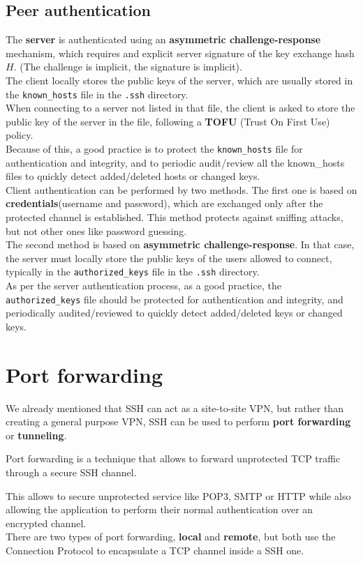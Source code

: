 \subsection{Peer authentication}
The \textbf{server} is authenticated using an \textbf{asymmetric
challenge-response} mechanism, which requires and explicit server
signature of the key exchange hash $H$. (The challenge is implicit,
the signature is implicit).\\
The client locally stores the public keys of the server, which are
usually stored in the \texttt{known\_hosts} file in the \texttt{.ssh}
directory.\\
When connecting to a server not listed in that file, the client is
asked to store the public key of the server in the file, following a 
\textbf{TOFU} (Trust On First Use) policy.\\
Because of this, a good practice is to protect the
\texttt{known\_hosts} file for authentication and integrity, and to
periodic audit/review all the known\_hosts files to quickly detect
added/deleted hosts or changed keys.\\
Client authentication can be performed by two methods. The first one
is based on \textbf{credentials}(username and password), which are
exchanged only after the protected channel is established. This method
protects against sniffing attacks, but not other ones like password
guessing.\\
The second method is based on \textbf{asymmetric challenge-response}.
In that case, the server must locally store the public keys
of the users allowed to connect, typically in the
\texttt{authorized\_keys} file in the \texttt{.ssh} directory.\\
As per the server authentication process, as a good practice, the
\texttt{authorized\_keys} file should be protected for authentication 
and integrity, and periodically audited/reviewed to quickly detect 
added/deleted keys or changed keys.
\section{Port forwarding}
We already mentioned that SSH can act as a site-to-site VPN, but
rather than creating a general purpose VPN, SSH can be used to perform 
\textbf{port forwarding} or \textbf{tunneling}.
\begin{boxH}
  Port forwarding is a technique that allows to forward unprotected
  TCP traffic through a secure SSH channel.
\end{boxH}
This allows to secure unprotected service like POP3, SMTP or HTTP
while also allowing the application to perform their normal
authentication over an encrypted channel.\\
There are two types of port forwarding, \textbf{local} and
\textbf{remote}, but both use the Connection Protocol to encapsulate a
TCP channel inside a SSH one.
